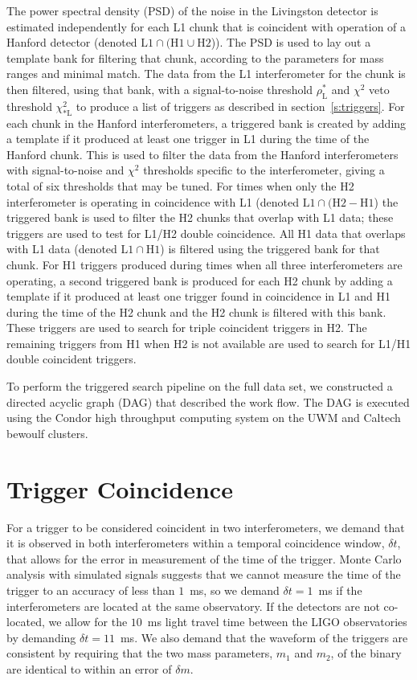 The power spectral density (PSD) of the noise in the Livingston detector is
estimated independently for each L1 chunk that is coincident with operation of
a Hanford detector (denoted $\mathrm{L1} \cap (\mathrm{H1} \cup
\mathrm{H2}$)).  The PSD is used to lay out a template bank for filtering that
chunk, according to the parameters for mass ranges and minimal
match\cite{Owen:1998dk}. The data from the L1 interferometer for the chunk is
then filtered, using that bank, with a signal-to-noise threshold
$\rho_{\mathrm{L}}^\ast$ and $\chi^2$ veto threshold
$\chi^2_{\ast\mathrm{L}}$ to produce a list of triggers as described in
section~\ref{s:triggers}.  For each chunk in the Hanford interferometers, a
{triggered bank} is created by adding a template if it produced at least one
trigger in L1 during the time of the Hanford chunk.  This is used to filter
the data from the Hanford interferometers with signal-to-noise and $\chi^2$
thresholds specific to the interferometer, giving a total of six thresholds
that may be tuned.  For times when only the H2 interferometer is operating in
coincidence with L1 (denoted $\mathrm{L1} \cap (\mathrm{H2} - \mathrm{H1}$)
the triggered bank is used to filter the H2 chunks that overlap with L1 data;
these triggers are used to test for L1/H2 double coincidence.  All H1 data
that overlaps with L1 data (denoted $\mathrm{L1} \cap \mathrm{H1}$) is
filtered using the triggered bank for that chunk. For H1 triggers produced
during times when all three interferometers are operating, a second triggered
bank is produced for each H2 chunk by adding a template if it produced at
least one trigger found in coincidence in L1 and H1 during the time of the H2
chunk and the H2 chunk is filtered with this bank.  These triggers are used to
search for triple coincident triggers in H2.  The remaining triggers from H1
when H2 is not available are used to search for L1/H1 double coincident
triggers.

To perform the triggered search pipeline on the full data set, we constructed
a directed acyclic graph (DAG) that described the work flow.  The DAG is
executed using the Condor high throughput computing system\cite{condor} on the
UWM and Caltech bewoulf clusters.

\section{Trigger Coincidence}
\label{s:coincidence}

For a trigger to be considered coincident in two interferometers, we demand
that it is observed in both interferometers within a temporal coincidence
window, $\delta t$, that allows for the error in measurement of the time of the trigger. Monte Carlo analysis with simulated signals suggests that we
cannot measure the time of the trigger to an accuracy of less than $1$~ms, so
we demand $\delta t = 1$~ms if the interferometers are located at the same
observatory. If the detectors are not co-located, we allow for the $10$~ms
light travel time between the LIGO observatories by demanding $\delta t =
11$~ms. We also demand that the waveform of the triggers are consistent by
requiring that the two mass parameters, $m_1$ and $m_2$, of the binary are
identical to within an error of $\delta m$.

